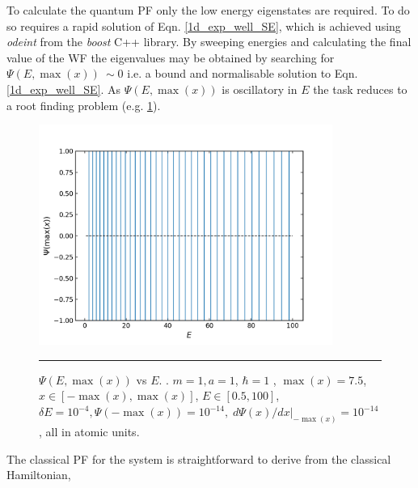 \documentclass[../main.tex]{subfiles}
\begin{document}
To calculate the quantum PF only the low energy eigenstates are required. To do so requires a rapid solution of Eqn. \eqref{1d_exp_well_SE}, which is achieved using \emph{odeint} from the \emph{boost} C++ library.\cite{Ahnert2011} By sweeping energies and calculating the final value of the WF the eigenvalues may be obtained by searching for $\Psi(E, \max(x)) \ \sim 0$ i.e. a bound and normalisable solution to Eqn. \eqref{1d_exp_well_SE}. As $\Psi(E, \max(x))$ is oscillatory in $E$ the task reduces to a root finding problem (e.g. \figurename{ \ref{1d_exp_well_psi_max_vs_energy}}).

\begin{figure}[h!]
	\centering
	\includegraphics[height=7.2cm]{4/figs/1d_exp_well_psi_max_vs_energy}
	\vspace{0.2cm}
	\hrule
	\caption{$\Psi(E, \max(x))$ vs $E$. . $m=1, a = 1$, $\hbar = 1$ , $\max(x) = 7.5$, $x \in [-\max(x), \max(x)]$, $E \in [0.5, 100]$, $\delta E = 10^{-4}, \Psi(-\!\max(x)) = 10^{-14},\; d\Psi(x)/dx|_{-\!\max(x)} = 10^{-14}$, all in atomic units.} 
	\label{1d_exp_well_psi_max_vs_energy}
\end{figure}
\newpage
The classical PF for the system is straightforward to derive from the classical Hamiltonian,
\end{document}
